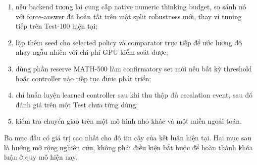 \begin{enumerate}
  \item nếu backend tương lai cung cấp native numeric thinking budget, so sánh
  nó với force-answer đã hoàn tất trên một split robustness mới, thay vì tuning
  tiếp trên Test-100 hiện tại;
  \item lặp thêm seed cho selected policy và comparator trực tiếp để ước lượng
  độ nhạy ngẫu nhiên với chi phí GPU kiểm soát được;
  \item dùng phần reserve MATH-500 làm confirmatory set mới nếu bất kỳ threshold
  hoặc controller nào tiếp tục được phát triển;
  \item chỉ huấn luyện learned controller sau khi thu thập đủ escalation event,
  sau đó đánh giá trên một Test chưa từng dùng;
  \item kiểm tra chuyển giao trên một mô hình nhỏ khác và một miền ngoài toán.
\end{enumerate}

Ba mục đầu có giá trị cao nhất cho độ tin cậy của kết luận hiện tại. Hai mục
sau là hướng mở rộng nghiên cứu, không phải điều kiện bắt buộc để hoàn thành
khóa luận ở quy mô hiện nay.
